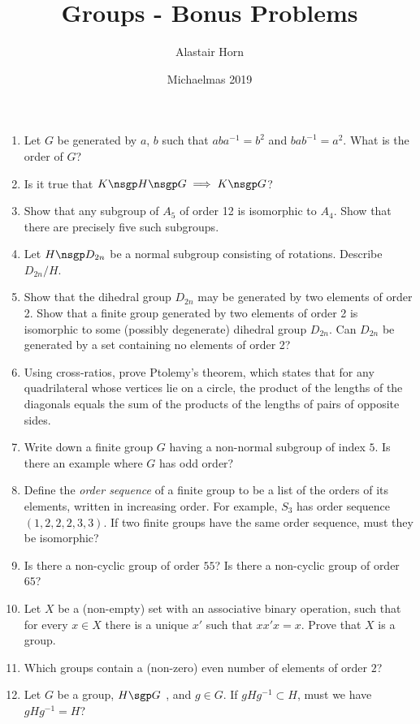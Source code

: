 \documentclass[a4paper,12pt]{article}
\author{Alastair Horn}
\date{Michaelmas 2019}
\title{Groups - Bonus Problems}
\begin{document}
\maketitle

\begin{enumerate}
 \item
  Let \(G\) be generated by \(a\), \(b\) such that \(aba^{-1} = b^2\) and
  \(bab^{-1} = a^2\). What is the order of \(G\)?
 \item
  Is it true that \(K \nsgp H \nsgp G \implies K \nsgp G\)?
 \item
  Show that any subgroup of \(A_5\) of order 12 is isomorphic to \(A_4\). Show
  that there are precisely five such subgroups.
 \item
  Let \(H \nsgp D_{2n}\) be a normal subgroup consisting of rotations. Describe
  \(D_{2n} / H\).
 \item
  Show that the dihedral group \(D_{2n}\) may be generated by two elements of
  order 2. Show that a finite group generated by two elements of order
  2 is isomorphic to some (possibly degenerate) dihedral group \(D_{2n}\). Can
  \(D_{2n}\) be generated by a set containing no elements of order 2?
 \item
  Using cross-ratios, prove Ptolemy’s theorem, which states that for any
  quadrilateral whose vertices lie on a circle, the product of the lengths of
  the diagonals equals the sum of the products of the lengths of pairs of
  opposite sides.
 \item
  Write down a finite group \(G\) having a non-normal subgroup of index \(5\).
  Is there an example where \(G\) has odd order?
 \item
  Define the \emph{order sequence} of a finite group to be a list of the orders
  of its elements, written in increasing order. For example, \(S_3\) has order
  sequence \((1, 2, 2, 2, 3, 3)\). If two finite groups have the same order
  sequence, must they be isomorphic?
 \item
  Is there a non-cyclic group of order \(55\)? Is there a non-cyclic group of
  order \(65\)?
 \item
  Let \(X\) be a (non-empty) set with an associative binary operation, such that
  for every \(x \in X\) there is a unique \(x'\) such that \(xx'x = x\). Prove
  that \(X\) is a group.
 \item
  Which groups contain a (non-zero) even number of elements of order \(2\)?
 \item
  Let \(G\) be a group, \(H \sgp G\) , and \(g \in G\). If
  \(gHg^{-1} \subset H\), must we have \(gHg^{-1} = H\)?

\end{enumerate}
\end{document}
